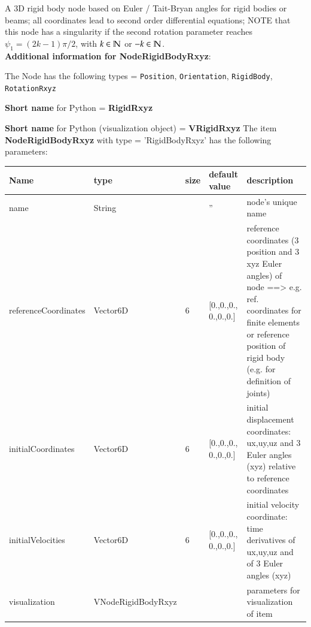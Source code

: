 \label{sec:item:NodeRigidBodyRxyz}
A 3D rigid body node based on Euler / Tait-Bryan angles for rigid bodies or beams; all coordinates lead to second order differential equations; NOTE that this node has a singularity if the second rotation parameter reaches $\psi_1 = (2k-1) \pi/2$, with $k \in \mathbb{N}$ or $-k \in \mathbb{N}$.\vspace{12pt}
 \\{\bf Additional information for NodeRigidBodyRxyz}:
\bi
  \item The Node has the following types = \texttt{Position}, \texttt{Orientation}, \texttt{RigidBody}, \texttt{RotationRxyz}
  \item {\bf Short name} for Python = {\bf RigidRxyz}  \item {\bf Short name} for Python (visualization object) = {\bf VRigidRxyz}\ei
\vspace{12pt} \noindent The item {\bf NodeRigidBodyRxyz} with type = 'RigidBodyRxyz' has the following parameters:\vspace{-1cm}\\ 
\begin{center}
  \footnotesize
  \begin{longtable}{| p{4.5cm} | p{2.5cm} | p{0.5cm} | p{2.5cm} | p{6cm} |}
    \hline
    \bf Name & \bf type & \bf size & \bf default value & \bf description \\ \hline
    name &     String &      &     '' &     node's unique name\\ \hline
    referenceCoordinates &     Vector6D &     6 &     [0.,0.,0., 0.,0.,0.] &     reference coordinates (3 position and 3 xyz Euler angles) of node ==> e.g. ref. coordinates for finite elements or reference position of rigid body (e.g. for definition of joints)\\ \hline
    initialCoordinates &     Vector6D &     6 &     [0.,0.,0., 0.,0.,0.] &     initial displacement coordinates: ux,uy,uz and 3 Euler angles (xyz) relative to reference coordinates\\ \hline
    initialVelocities &     Vector6D &     6 &     [0.,0.,0., 0.,0.,0.] &     initial velocity coordinate: time derivatives of ux,uy,uz and of 3 Euler angles (xyz)\\ \hline
    visualization & VNodeRigidBodyRxyz & & & parameters for visualization of item \\ \hline
	  \end{longtable}
	\end{center}
